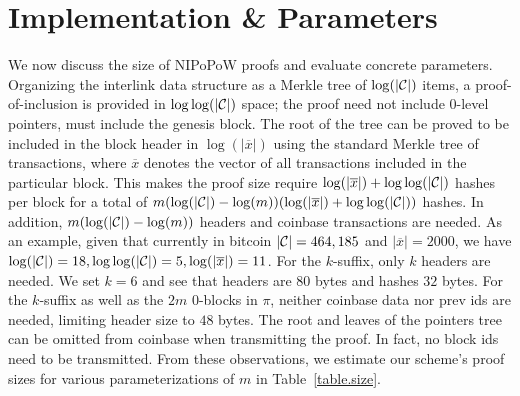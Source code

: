 \section{Implementation \& Parameters}



We now discuss the size of NIPoPoW proofs and evaluate concrete parameters.
Organizing the interlink data structure as a Merkle tree of $\log(|\mathcal{C}|)$ items, a
proof-of-inclusion is provided in $\log \log(|\mathcal{C}|)$ space;
the proof need not include $0$-level pointers, must include the genesis block. The root of the
tree can be proved to be included in the block header in $\log(|\overline
x|)$ using the standard Merkle tree of transactions, where $\overline x$ denotes
the vector of all transactions included in the particular block. This makes the
proof size require $\log(|\overline x|) + \log\log(|\mathcal{C}|)$ hashes per block
for a total of $m (\log(|\mathcal{C}|) - \log(m))(\log(|\overline x|) +
\log\log(|\mathcal{C}|))$ hashes. In addition, $m (\log(|\mathcal{C}|) - \log(m))$ headers
and coinbase transactions are needed. As an example, given that currently in
bitcoin $|\mathcal{C}| = 464,185$ and $|\overline x| = 2000$, we have $\log(|\mathcal{C}|) =
18, \log\log(|\mathcal{C}|) = 5, \log(|\overline x|) = 11$. For the $k$-suffix, only
$k$ headers are needed. We set $k = 6$ and see that headers are $80$ bytes and
hashes $32$ bytes. For the $k$-suffix as well as the $2m$ $0$-blocks in $\pi$,
neither coinbase data nor prev ids are needed, limiting header size to $48$
bytes. The root and leaves of the pointers tree can be omitted from coinbase
when transmitting the proof. In fact, no block ids need to be transmitted. From
these observations, we estimate our scheme's proof sizes for various
parameterizations of $m$ in Table~\ref{table.size}.

